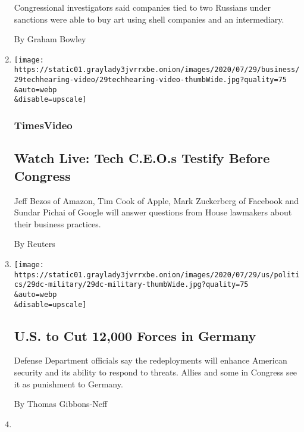 \begin{enumerate}
  Congressional investigators said companies tied to two Russians under
  sanctions were able to buy art using shell companies and an
  intermediary.

  By Graham Bowley
\item
  \href{/video/us/politics/100000007262236/congress-tech-antitrust-hearings-live.html}{}

  \texttt{[image: https://static01.graylady3jvrrxbe.onion/images/2020/07/29/business/29techhearing-video/29techhearing-video-thumbWide.jpg?quality=75\\\&auto=webp\\\&disable=upscale]}

  \hypertarget{timesvideo}{%
  \subsubsection{TimesVideo}\label{timesvideo}}

  \hypertarget{watch-live-tech-ceos-testify-before-congress}{%
  \subsection{Watch Live: Tech C.E.O.s Testify Before
  Congress}\label{watch-live-tech-ceos-testify-before-congress}}

  Jeff Bezos of Amazon, Tim Cook of Apple, Mark Zuckerberg of Facebook
  and Sundar Pichai of Google will answer questions from House lawmakers
  about their business practices.

  By Reuters
\item
  \href{/2020/07/29/world/europe/us-troops-nato-germany.html}{}

  \texttt{[image: https://static01.graylady3jvrrxbe.onion/images/2020/07/29/us/politics/29dc-military/29dc-military-thumbWide.jpg?quality=75\\\&auto=webp\\\&disable=upscale]}

  \hypertarget{us-to-cut-12000-forces-in-germany}{%
  \subsection{U.S. to Cut 12,000 Forces in
  Germany}\label{us-to-cut-12000-forces-in-germany}}

  Defense Department officials say the redeployments will enhance
  American security and its ability to respond to threats. Allies and
  some in Congress see it as punishment to Germany.

  By Thomas Gibbons-Neff
\item
  \href{/2020/07/29/us/politics/trump-putin-bounties.html}{}


\end{enumerate}
